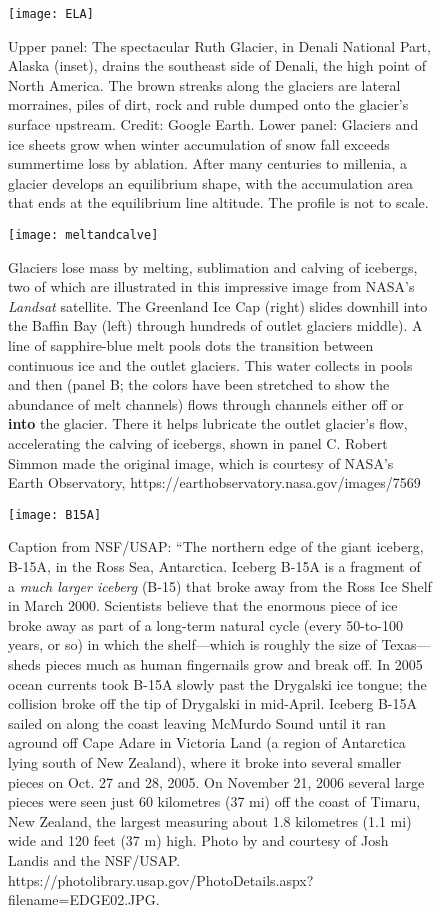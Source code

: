 \begin{figure}[p]
	\centering
  \texttt{[image: ELA]}%
	\caption{Upper panel: The spectacular Ruth Glacier, in Denali National Part, Alaska (inset), drains the southeast side of Denali, the high point of North America. The brown streaks along the glaciers are lateral morraines, piles of dirt, rock and ruble dumped onto the glacier's surface upstream. Credit: Google Earth. Lower panel: Glaciers and ice sheets grow when winter accumulation of snow fall exceeds summertime loss by ablation. After many centuries to millenia, a glacier develops an equilibrium shape, with the accumulation area that ends at the equilibrium line altitude. The profile is not to scale.  }
	\label{fig:ELA}
\end{figure}

\begin{figure}[p]
	\centering
  \texttt{[image: meltandcalve]}%
	\caption{Glaciers lose mass by melting, sublimation and calving of icebergs, two of which are illustrated in this impressive image from NASA's \textit{Landsat} satellite. The Greenland Ice Cap (right) slides downhill into the Baffin Bay (left) through hundreds of outlet glaciers middle). A line of sapphire-blue melt pools dots the transition between continuous ice and the outlet glaciers. This water collects in pools and then (panel B; the colors have been stretched to show the abundance of melt channels) flows through channels either off or \textbf{into} the glacier. There it helps lubricate the outlet glacier's flow, accelerating the calving of icebergs, shown in panel C. Robert Simmon made the original image, which is courtesy of NASA's Earth Observatory, https://earthobservatory.nasa.gov/images/7569  }
	\label{fig:glacial_loss}
\end{figure}

\begin{figure}[p]
	\centering
  \texttt{[image: B15A]}%
	\caption{Caption from NSF/USAP: ``The northern edge of the giant iceberg, B-15A, in the Ross Sea, Antarctica. Iceberg B-15A is a fragment of a \emph{much larger iceberg} (B-15) that broke away from the Ross Ice Shelf in March 2000. Scientists believe that the enormous piece of ice broke away as part of a long-term natural cycle (every 50-to-100 years, or so) in which the shelf---which is roughly the size of Texas---sheds pieces much as human fingernails grow and break off. In 2005 ocean currents took B-15A slowly past the Drygalski ice tongue; the collision broke off the tip of Drygalski in mid-April. Iceberg B-15A sailed on along the coast leaving McMurdo Sound until it ran aground off Cape Adare in Victoria Land (a region of Antarctica lying south of New Zealand), where it broke into several smaller pieces on Oct. 27 and 28, 2005. On November 21, 2006 several large pieces were seen just 60 kilometres (37 mi) off the coast of Timaru, New Zealand, the largest measuring about 1.8 kilometres (1.1 mi) wide and 120 feet (37 m) high. Photo by and courtesy of Josh Landis and the NSF/USAP. https://photolibrary.usap.gov/PhotoDetails.aspx?filename=EDGE02.JPG.}  
	\label{fig:B15}
\end{figure}


